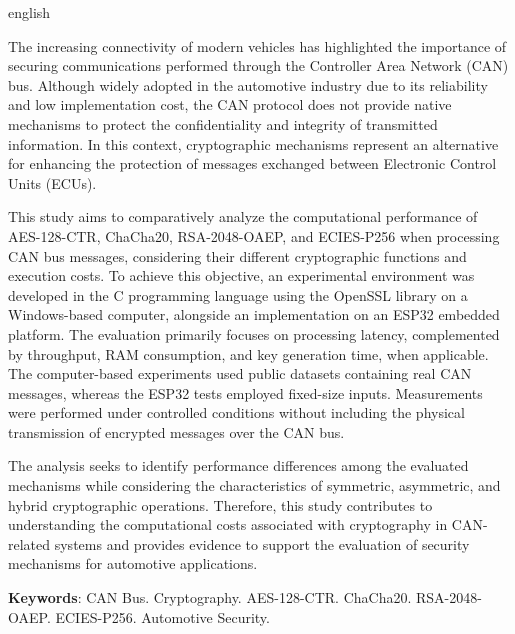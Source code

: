 \begin{resumo}[Abstract]
    \SingleSpacing
    \begin{otherlanguage*}{english}

        The increasing connectivity of modern vehicles has highlighted the importance of securing communications performed through the Controller Area Network (CAN) bus. Although widely adopted in the automotive industry due to its reliability and low implementation cost, the CAN protocol does not provide native mechanisms to protect the confidentiality and integrity of transmitted information. In this context, cryptographic mechanisms represent an alternative for enhancing the protection of messages exchanged between Electronic Control Units (ECUs).

        This study aims to comparatively analyze the computational performance of AES-128-CTR, ChaCha20, RSA-2048-OAEP, and ECIES-P256 when processing CAN bus messages, considering their different cryptographic functions and execution costs. To achieve this objective, an experimental environment was developed in the C programming language using the OpenSSL library on a Windows-based computer, alongside an implementation on an ESP32 embedded platform. The evaluation primarily focuses on processing latency, complemented by throughput, RAM consumption, and key generation time, when applicable. The computer-based experiments used public datasets containing real CAN messages, whereas the ESP32 tests employed fixed-size inputs. Measurements were performed under controlled conditions without including the physical transmission of encrypted messages over the CAN bus.

        The analysis seeks to identify performance differences among the evaluated mechanisms while considering the characteristics of symmetric, asymmetric, and hybrid cryptographic operations. Therefore, this study contributes to understanding the computational costs associated with cryptography in CAN-related systems and provides evidence to support the evaluation of security mechanisms for automotive applications.

        \vspace{\onelineskip}
        \noindent\textbf{Keywords}: CAN Bus. Cryptography. AES-128-CTR. ChaCha20. RSA-2048-OAEP. ECIES-P256. Automotive Security.

    \end{otherlanguage*}
\end{resumo}